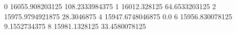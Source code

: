0 16055.908203125 108.2333984375
1 16012.328125 64.6533203125
2 15975.9794921875 28.3046875
4 15947.6748046875 0.0
6 15956.830078125 9.1552734375
8 15981.1328125 33.4580078125
